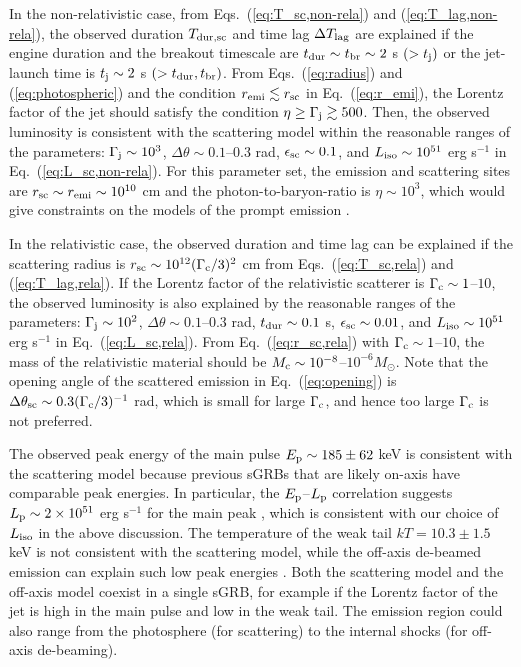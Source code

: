 \documentclass{emulateapj}
\begin{document}
In the non-relativistic case, 
from Eqs.~(\ref{eq:T_sc,non-rela}) and (\ref{eq:T_lag,non-rela}),
the observed duration $T_{\rm dur,sc}$ 
and time lag $\Delta T_{\rm lag}$ are explained if
the engine duration and the breakout timescale are
$t_{\rm dur}\sim t_{\rm br}\sim2$ s $(> t_{\rm j})$
or the jet-launch time is $t_{\rm j} \sim 2$ s $(> t_{\rm dur}, t_{\rm br})$.
From Eqs.~(\ref{eq:radius}) and (\ref{eq:photospheric}) and 
the condition $r_{\rm emi}\lesssim r_{\rm sc}$ in Eq.~(\ref{eq:r_emi}), 
the Lorentz factor of the jet should satisfy the condition $\eta\ge\Gamma_{\rm j}\gtrsim500$.
Then, the observed luminosity is consistent with the scattering model 
within the reasonable ranges of the parameters:
$\Gamma_{\rm j}\sim10^3$,
$\Delta\theta\sim 0.1$--$0.3$ rad, $\epsilon_{\rm sc}\sim0.1$, and $L_{\rm iso}\sim10^{51}$ erg s$^{-1}$
in Eq.~(\ref{eq:L_sc,non-rela}). 
For this parameter set, 
the emission and scattering sites are $r_{\rm sc}\sim r_{\rm emi}\sim10^{10}$ cm and the photon-to-baryon-ratio is $\eta\sim 10^3$, 
which would give constraints on the models of the prompt emission \citep[e.g., ][]{2000ApJ...530..292M, 2011PThPh.126..555I}.

In the relativistic case, 
the observed duration and time lag can be explained if
the scattering radius is $r_{\rm sc}\sim10^{12} (\Gamma_{\rm c}/3)^{2}$ cm
from Eqs.~(\ref{eq:T_sc,rela}) and (\ref{eq:T_lag,rela}).
If the Lorentz factor of the relativistic scatterer is
$\Gamma_{\rm c} \sim 1$--$10$,
the observed luminosity is also explained by the reasonable ranges of the parameters:
$\Gamma_{\rm j}\sim10^2$,
$\Delta\theta\sim 0.1$--$0.3$ rad,
$t_{\rm dur} \sim 0.1$ s,
$\epsilon_{\rm sc}\sim0.01$, and $L_{\rm iso}\sim10^{51}$ erg s$^{-1}$
in Eq.~(\ref{eq:L_sc,rela}).
From Eq.~(\ref{eq:r_sc,rela}) with $\Gamma_{\rm c} \sim 1$--$10$,
the mass of the relativistic material should be 
$M_{\rm c}\sim 10^{-8}$--$10^{-6} M_{\odot}$.
Note that the opening angle of the scattered emission in Eq.~(\ref{eq:opening})
is $\Delta\theta_{\rm sc} \sim 0.3 (\Gamma_{\rm c}/3)^{-1}$ rad,
which is small for large $\Gamma_{\rm c}$,
and hence too large $\Gamma_{\rm c}$ is not preferred.

The observed peak energy of the main pulse 
$E_{\rm p}\sim 185 \pm 62$ keV
is consistent with the scattering model
because previous sGRBs that are likely on-axis have comparable peak energies.
In particular, the $E_{\rm p}$--$L_{\rm p}$ correlation suggests $L_{\rm p}\sim2\times10^{51}$ erg s$^{-1}$ 
for the main peak \citep{2013MNRAS.431.1398T}, which is consistent with our choice of $L_{\rm iso}$ in the above discussion.
The temperature of the weak tail $kT=10.3 \pm 1.5$ keV
is not consistent with the scattering model,
while the off-axis de-beamed emission can explain such low peak energies
\citep{2017arXiv171005905I}.
Both the scattering model and the off-axis model coexist in a single sGRB,
for example if the Lorentz factor of the jet is high in the main pulse
and low in the weak tail.
The emission region could also range from
the photosphere (for scattering) to
the internal shocks (for off-axis de-beaming).
\end{document}
